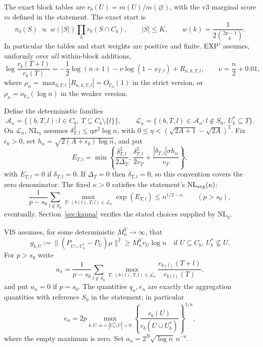 \documentclass[11pt]{article}
\theoremstyle{remark}\newtheorem{remark}{Remark}
\newcommand{\PP}{\mathbb P_0}
\newcommand{\op}{o_{\PP}}
\newcommand{\Op}{O_{\PP}}
\newcommand{\Lc}{\mathcal L_n}
\newcommand{\Ac}{\mathcal A_n}
\begin{document}
The exact block tables are $r_b(U)=m(U)/m(\varnothing)$, with the v3 marginal
score $m$ defined in the statement. The exact start is
\[
 \pi_0(S)\ \propto\ w(|S|)\prod_b r_b(S\cap C_b),\qquad
 |S|\le K,\qquad w(k)=\frac{1}{2\binom{2p-1}{k}}.
\]
In particular the tables and start weights are positive and finite.
EXP$'$ assumes, uniformly over \emph{all} within-block additions,
\begin{equation}\label{eq:expprime}
 \log\frac{r_b(T+l)}{r_b(T)}
 =-\frac12\log(n+1)-\nu\log(1-x_{T,l})+R_{n,b,T,l},
 \qquad \nu=\frac n2+0.01,
\end{equation}
where $\rho_n=\max_{b,T,l}|R_{n,b,T,l}|=\Op(1)$ in the strict version,
or $\rho_n=\op(\log n)$ in the weaker version.

Define the deterministic families
\[
 \Ac=\{(b,T,l):l\in C_b,\ T\subseteq C_b\setminus\{l\}\},\qquad
 \Lc=\{(b,T,l)\in\Ac:l\notin S_0,\ U_b^*\subseteq T\}.
\]
On $\Lc$, $\mathrm{NL}_{\eta}$ assumes
$\delta_{T,l}^2\le\eta\sigma^2\log n$, with
$0\le\eta<(\sqrt{2A+1}-\sqrt{2A})^2$.
Fix $\epsilon_0>0$, set $h_n=\sqrt{2(A+\epsilon_0)\log n}$, and put
\begin{equation}\label{eq:E}
 E_{T,l}=\min\left\{\frac{\delta_{T,l}^2}{2\Delta_T},\,
 \frac{\delta_{T,l}^2}{2v_T}+
 \frac{|\delta_{T,l}|\sigma h_n}{v_T}\right\},
\end{equation}
with $E_{T,l}=0$ if $\delta_{T,l}=0$. If $\Delta_T=0$ then
$\delta_{T,l}=0$, so this convention covers the zero denominator.
The fixed $\kappa>0$ satisfies the statement's $\mathrm{NL}_{\rm avg}(\kappa)$:
\begin{equation}\label{eq:avg}
 \frac1{p-s_0}\sum_{l\notin S_0}
 \max_{T:\,(b(l),T,l)\in\Lc}\exp(E_{T,l})
 \le n^{1/2-\kappa}\qquad(p>s_0),
\end{equation}
eventually. Section~\ref{sec:kappa} verifies the stated choices supplied by
$\mathrm{NL}_{\eta}$.

VIS assumes, for some deterministic $M_n^V\to\infty$, that
\begin{equation}\label{eq:vis}
 g_{b,U}:=\|(P_{U\cup U_b^*}-P_U)\mu\|^2
 \ge M_n^V v_U\log n
 \quad\text{if }U\subseteq C_b,\ U_b^*\not\subseteq U.
\end{equation}
For $p>s_0$ write
\[
 u_n=\frac1{p-s_0}\sum_{l\notin S_0}
 \max_{T:\,(b(l),T,l)\in\Lc}\frac{r_{b(l)}(T+l)}{r_{b(l)}(T)},
\]
and put $u_n=0$ if $p=s_0$. The quantities $q_n,e_n$ are exactly the
aggregation quantities with reference $S_0$ in the statement; in particular
\begin{equation}\label{eq:edef}
 e_n=2p\max_{b,U:\,a=|U_b^*\setminus U|>0}
 \left\{\frac{r_b(U)}{r_b(U\cup U_b^*)}\right\}^{1/a},
\end{equation}
where the empty maximum is zero. Set $a_n=2^B\sqrt{\log n}\,n^{-\kappa}$.
\end{document}
